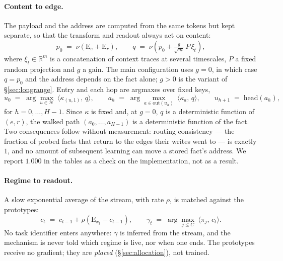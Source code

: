 \documentclass[11pt,a4paper]{article}
\begin{document}
\paragraph{Content to edge.}
The payload and the address are computed from the same tokens but kept
separate, so that the transform and readout always act on content:
\begin{equation}
  p_0 \;=\; \nu\!\left(\mathrm{E}_e + \mathrm{E}_r\right),
  \qquad
  q \;=\; \nu\!\left(p_0 + \tfrac{g}{\sqrt{m}}\, P\,\xi_t\right),
  \label{eq:payload}
\end{equation}
where $\xi_t\in\mathbb{R}^m$ is a concatenation of context traces at several
timescales, $P$ a fixed random projection and $g$ a gain. The main
configuration uses $g=0$, in which case $q=p_0$ and the address depends on the
fact alone; $g>0$ is the variant of \S\ref{sec:longrange}. Entry and each hop
are argmaxes over fixed keys,
\begin{equation}
  u_0 \;=\; \arg\max_{u\in\mathcal{N}}\ \langle \kappa_{(u,1)},\, q\rangle,
  \qquad
  a_h \;=\; \arg\max_{a\in\mathrm{out}(u_h)}\ \langle \kappa_a,\, q\rangle,
  \qquad
  u_{h+1} \;=\; \mathrm{head}(a_h),
  \label{eq:route}
\end{equation}
for $h=0,\dots,H-1$. Since $\kappa$ is fixed and, at $g=0$, $q$ is a
deterministic function of $(e,r)$, the walked path $(a_0,\dots,a_{H-1})$ is a
deterministic function of the fact. Two consequences follow without
measurement: routing consistency --- the fraction of probed facts that return
to the edges their writes went to --- is exactly $1$, and no amount of
subsequent learning can move a stored fact's address. We report $1.000$ in the
tables as a check on the implementation, not as a result.

\paragraph{Regime to readout.}
A slow exponential average of the stream, with rate $\rho$, is matched against
the prototypes:
\begin{equation}
  c_t \;=\; c_{t-1} + \rho\left(\mathrm{E}_{x_t} - c_{t-1}\right),
  \qquad
  \gamma_t \;=\; \arg\max_{j\le C}\ \big\langle \pi_j,\, c_t \big\rangle .
  \label{eq:regime}
\end{equation}
No task identifier enters anywhere: $\gamma$ is inferred from the stream, and
the mechanism is never told which regime is live, nor when one ends. The
prototypes receive no gradient; they are \emph{placed} (\S\ref{sec:allocation}),
not trained.
\end{document}
